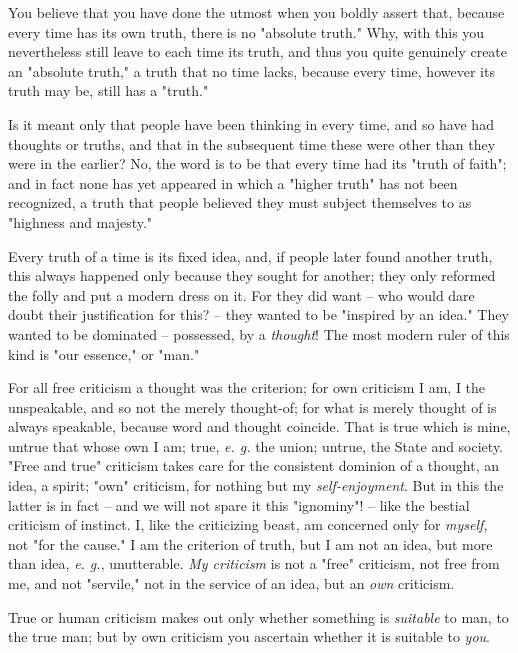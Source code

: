 \documentclass[a4paper]{book}
\begin{document}
You believe that you have done the utmost when you boldly assert that, because 
every time has its own truth, there is no "{}absolute truth."{} Why, with this 
you nevertheless still leave to each time its truth, and thus you quite 
genuinely create an "{}absolute truth,"{} a truth that no time lacks, because 
every time, however its truth may be, still has a "{}truth."{}

Is it meant only that people have been thinking in every time, and so have had 
thoughts or truths, and that in the subsequent time these were other than they 
were in the earlier? No, the word is to be that every time had its "{}truth of 
faith"{}; and in fact none has yet appeared in which a "{}higher truth"{} has 
not been recognized, a truth that people believed they must subject themselves 
to as "{}highness and majesty."{}

Every truth of a time is its fixed idea, and, if people later found another 
truth, this always happened only because they sought for another; they only 
reformed the folly and put a modern dress on it. For they did want -- who 
would dare doubt their justification for this? -- they wanted to be 
"{}inspired by an idea."{} They wanted to be dominated -- possessed, by a 
\textit{thought}! The most modern ruler of this kind is "{}our essence,"{} or 
"{}man."{}

For all free criticism a thought was the criterion; for own criticism I am, I 
the unspeakable, and so not the merely thought-of; for what is merely thought 
of is always speakable, because word and thought coincide. That is true which 
is mine, untrue that whose own I am; true, \textit{e. g.} the union; untrue, 
the State and society. "{}Free and true"{} criticism takes care for the 
consistent dominion of a thought, an idea, a spirit; "{}own"{} criticism, for 
nothing but my \textit{self-enjoyment}. But in this the latter is in fact -- 
and we will not spare it this "{}ignominy"{}! -- like the bestial criticism of 
instinct. I, like the criticizing beast, am concerned only for 
\textit{myself}, not "{}for the cause."{} I am the criterion of truth, but I 
am not an idea, but more than idea, \textit{e. g.}, unutterable. \textit{My 
criticism} is not a "{}free"{} criticism, not free from me, and not 
"{}servile,"{} not in the service of an idea, but an \textit{own} criticism.

True or human criticism makes out only whether something is \textit{suitable} 
to man, to the true man; but by own criticism you ascertain whether it is 
suitable to \textit{you}.
\end{document}
